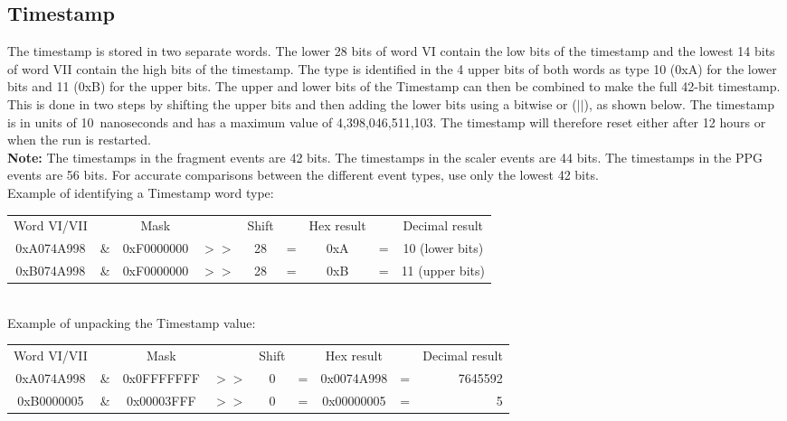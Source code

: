 \documentclass[letterpaper,12pt,notitlepage]{report}
\begin{document}
\subsection{Timestamp}

The timestamp is stored in two separate words. The lower 28 bits of word VI contain the low bits of the timestamp and the lowest 14 bits of word VII contain the high bits of the timestamp. The type is identified in the 4 upper bits of both words as type 10 (0xA) for the lower bits and 11 (0xB) for the upper bits. The upper and lower bits of the Timestamp can then be combined to make the full 42-bit timestamp. This is done in two steps by shifting the upper bits and then adding the lower bits using a bitwise or ($||$), as shown below. The timestamp is in units of 10~nanoseconds and has a maximum value of 4,398,046,511,103. The timestamp will therefore reset either after 12 hours or when the run is restarted.\\

{\bf Note:} The timestamps in the fragment events are 42 bits. The timestamps in the scaler events are 44 bits. The timestamps in the PPG events are 56 bits. For accurate comparisons between the different event types, use only the lowest 42 bits.\\

Example of identifying a Timestamp word type:\\

\begin{tabular}{ccccccccc}
Word VI/VII &  & Mask & & Shift & & Hex result & & Decimal result\\
0xA074A998 & \& & 0xF0000000 & $>>$ & 28 & = & 0xA & = & 10 (lower bits)\\
0xB074A998 & \& & 0xF0000000 & $>>$ & 28 & = & 0xB & = & 11 (upper bits)\\
\end{tabular}\\

Example of unpacking the Timestamp value:\\

\begin{tabular}{ccccccccr}
Word VI/VII &  & Mask & & Shift & & Hex result & & Decimal result\\
0xA074A998 & \& & 0x0FFFFFFF & $>>$ & 0 & = & 0x0074A998 & = & 7645592\\
0xB0000005 & \& & 0x00003FFF & $>>$ & 0 & = & 0x00000005 & = & 5\\
\end{tabular}\\
\end{document}
